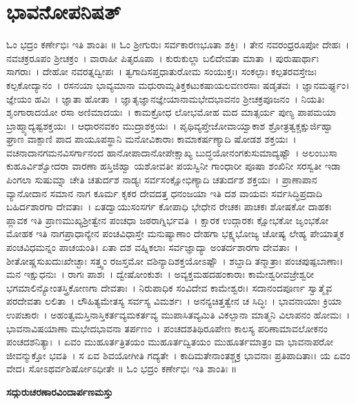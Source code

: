 \section{ಭಾವನೋಪನಿಷತ್}
ಓಂ ಭದ್ರಂ ಕರ್ಣೇಭಿಃ ಇತಿ ಶಾಂತಿಃ ॥
ಓಂ ಶ್ರೀಗುರುಃ ಸರ್ವಕಾರಣಭೂತಾ ಶಕ್ತಿಃ~। ತೇನ ನವರಂಧ್ರರೂಪೋ ದೇಹಃ~। ನವಚಕ್ರರೂಪಂ ಶ್ರೀಚಕ್ರಂ~। ವಾರಾಹೀ ಪಿತೃರೂಪಾ~। ಕುರುಕುಲ್ಲಾ ಬಲಿದೇವತಾ ಮಾತಾ~। ಪುರುಷಾರ್ಥಾಃ ಸಾಗರಾಃ~। ದೇಹೋ ನವರತ್ನದ್ವೀಪಃ~। ತ್ವಗಾದಿಸಪ್ತಧಾತುರೋಮ ಸಂಯುಕ್ತಃ। ಸಂಕಲ್ಪಾಃ ಕಲ್ಪತರವಸ್ತೇಜಃ ಕಲ್ಪಕೋ\-ದ್ಯಾನಂ~। ರಸನಯಾ ಭಾವ್ಯಮಾನಾ ಮಧುರಾಮ್ಲತಿಕ್ತಕಟುಕಷಾಯಲವಣರಸಾಃ ಷಡೃತವಃ~। ಜ್ಞಾನಮರ್ಘ್ಯಂ। ಜ್ಞೇಯಂ ಹವಿಃ~। ಜ್ಞಾತಾ ಹೋತಾ~। ಜ್ಞಾತೃಜ್ಞಾನಜ್ಞೇಯಾನಾಮಭೇದಭಾವನಂ ಶ್ರೀಚಕ್ರಪೂಜನಂ~। ನಿಯತಿಃ ಶೃಂಗಾರಾದಯೋ ರಸಾ ಅಣಿಮಾದಯಃ~। ಕಾಮಕ್ರೋಧ ಲೋಭಮೋಹ ಮದ ಮಾತ್ಸರ್ಯ ಪುಣ್ಯ ಪಾಪಮಯಾ ಬ್ರಾಹ್ಮ್ಯಾದ್ಯಷ್ಟಶಕ್ತಯಃ~। ಆಧಾರನವಕಂ ಮುದ್ರಾಶಕ್ತಯಃ~। ಪೃಥಿವ್ಯಪ್ತೇಜೋವಾಯ್ವಾಕಾಶ ಶ್ರೋತ್ರತ್ವಕ್ಚಕ್ಷುರ್ಜಿಹ್ವಾ ಘ್ರಾಣ ವಾಕ್ಪಾಣಿ ಪಾದ ಪಾಯೂಪಸ್ಥಾನಿ ಮನೋವಿಕಾರಾಃ ಕಾಮಾಕರ್ಷಣ್ಯಾದಿ ಷೋಡಶ ಶಕ್ತಯಃ~। ವಚನಾದಾನಗಮನವಿಸರ್ಗಾನಂದ ಹಾನೋಪಾದಾನೋಪೇಕ್ಷಾಖ್ಯ ಬುದ್ಧಯೋನಂಗಕುಸುಮಾದ್ಯಷ್ಟೌ~। ಅಲಂಬುಸಾ ಕುಹೂರ್ವಿಶ್ವೋದರಾ ವಾರಣಾ ಹಸ್ತಿಜಿಹ್ವಾ ಯಶೋವತೀ ಪಯಸ್ವಿನೀ ಗಾಂಧಾರೀ ಪೂಷಾ ಶಂಖಿನೀ ಸರಸ್ವತೀ ಇಡಾ ಪಿಂಗಲಾ ಸುಷುಮ್ನಾ ಚೇತಿ ಚತುರ್ದಶ ನಾಡ್ಯಃ ಸರ್ವಸಂಕ್ಷೋಭಿಣ್ಯಾದಿ ಚತುರ್ದಶ ಶಕ್ತಯಃ~। ಪ್ರಾಣಾಪಾನ ವ್ಯಾನೋದಾನ ಸಮಾನ ನಾಗ ಕೂರ್ಮ ಕೃಕರ ದೇವದತ್ತ ಧನಂಜಯಾ ಇತಿ ದಶ ವಾಯವಃ ಸರ್ವಸಿದ್ಧಿಪ್ರದಾದಿ ಬಹಿರ್ದಶಾರಗಾ ದೇವತಾಃ~। ಏತದ್ವಾಯುಸಂಸರ್ಗ ಕೋಪಾಧಿ ಭೇಧೇನ ರೇಚಕಃ ಪಾಚಕಃ ಶೋಷಕೋ ದಾಹಕಃ ಪ್ಲಾವಕ ಇತಿ ಪ್ರಾಣಮುಖ್ಯಶ್ರೀತ್ವೇನ ಪಂಚಧಾ ಜಠರಾಗ್ನಿರ್ಭವತಿ~। ಕ್ಷಾರಕ ಉದ್ಗಾರಕಃ ಕ್ಷೋಭಕೋ ಜೃಂಭಕೋ ಮೋಹಕ ಇತಿ ನಾಗಪ್ರಾಧಾನ್ಯೇನ ಪಂಚವಿಧಾಸ್ತೇ ಮನುಷ್ಯಾಣಾಂ ದೇಹಗಾ ಭಕ್ಷ್ಯಭೋಜ್ಯ ಚೋಷ್ಯ ಲೇಹ್ಯ ಪೇಯಾತ್ಮಕ ಪಂಚವಿಧಮನ್ನಂ ಪಾಚಯಂತಿ। ಏತಾ ದಶ ವಹ್ನಿಕಲಾಃ ಸರ್ವಜ್ಞಾದ್ಯಾ ಅಂತರ್ದಶಾರಗಾ ದೇವತಾಃ~। ಶೀತೋಷ್ಣಸುಖದುಃಖೇಚ್ಛಾಃ ಸತ್ತ್ವಂ ರಜಸ್ತಮೋ ವಶಿನ್ಯಾದಿಶಕ್ತಯೋಽಷ್ಟೌ~। ಶಬ್ದಾದಿ ತನ್ಮಾತ್ರಾಃ ಪಂಚಪುಷ್ಪಬಾಣಾಃ। ಮನ ಇಕ್ಷುಧನುಃ~। ರಾಗಃ ಪಾಶಃ~। ದ್ವೇಷೋಂಕುಶಃ~। ಅವ್ಯಕ್ತಮಹದಹಂಕಾರಾಃ ಕಾಮೇಶ್ವರೀವಜ್ರೇಶ್ವರೀ ಭಗಮಾಲಿನ್ಯೋಂತಸ್ತ್ರಿಕೋಣಗಾ ದೇವತಾಃ~। ನಿರುಪಾಧಿಕ ಸಂವಿದೇವ ಕಾಮೇಶ್ವರಃ। ಸದಾನಂದಪೂರ್ಣ ಸ್ವಾತ್ಮೈವ ಪರದೇವತಾ ಲಲಿತಾ~। ಲೌಹಿತ್ಯಮೇತಸ್ಯ ಸರ್ವಸ್ಯ ವಿಮರ್ಶಃ~। ಅನನ್ಯಚಿತ್ತತ್ವೇನ ಚ ಸಿದ್ಧಿಃ~। ಭಾವನಾಯಾಃ ಕ್ರಿಯಾ ಉಪಚಾರಃ~। ಅಹಂತ್ವಮಸ್ತಿನಾಸ್ತಿಕರ್ತವ್ಯಮಕರ್ತವ್ಯ ಮುಪಾಸಿತವ್ಯಮಿತಿ ವಿಕಲ್ಪಾನಾ ಮಾತ್ಮನಿ ವಿಲಾಪನಂ ಹೋಮಃ~। ಭಾವನಾವಿಷಯಾಣಾ ಮಭೇದಭಾವನಾ ತರ್ಪಣಂ~। ಪಂಚದಶತಿಥಿರೂಪೇಣ ಕಾಲಸ್ಯ ಪರಿಣಾಮಾವಲೋಕನಂ ಪಂಚದಶನಿತ್ಯಾಃ~। ಏವಂ ಮುಹೂರ್ತತ್ರಿತಯಂ ಮುಹೂರ್ತದ್ವಿತಯಂ ಮುಹೂರ್ತಮಾತ್ರಂ ವಾ ಭಾವನಾಪರೋ ಜೀವನ್ಮುಕ್ತೋ ಭವತಿ~। ಸ ಏವ ಶಿವಯೋಗೀತಿ ಗದ್ಯತೇ~। ಕಾದಿಮತೇನಾಂತಶ್ಚಕ್ರ ಭಾವನಾಃ ಪ್ರತಿಪಾದಿತಾಃ। ಯ ಏವಂ ವೇದ। ಸೋಽಥರ್ವಶಿರ್ಷೋಽಧೀತೇ ॥ ಓಂ ಭದ್ರಂ ಕರ್ಣೇಭಿಃ ಇತಿ ಶಾಂತಿಃ ॥
\begin{center}{\LARGE\bfseries ಸದ್ಗುರುಚರಣಾರವಿಂದಾರ್ಪಣಮಸ್ತು}\end{center}
